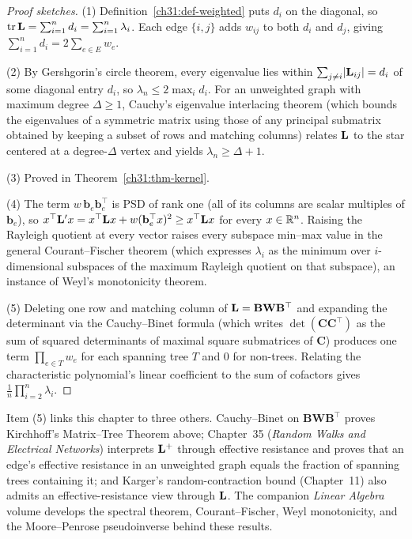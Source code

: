 \begin{proof}[Proof sketches]
(1) Definition~\ref{ch31:def-weighted} puts $d_i$ on the diagonal, so $\operatorname{tr}\mathbf{L} = \sum_{i=1}^n d_i = \sum_{i=1}^n \lambda_i$. Each edge $\{i,j\}$ adds $w_{ij}$ to both $d_i$ and $d_j$, giving $\sum_{i=1}^n d_i = 2\sum_{e\in E} w_e$.

(2) By Gershgorin's circle theorem, every eigenvalue lies within $\sum_{j\neq i}\lvert\mathbf{L}_{ij}\rvert = d_i$ of some diagonal entry $d_i$, so $\lambda_n \le 2\max_i d_i$. For an unweighted graph with maximum degree $\Delta \ge 1$, Cauchy's eigenvalue interlacing theorem (which bounds the eigenvalues of a symmetric matrix using those of any principal submatrix obtained by keeping a subset of rows and matching columns) relates $\mathbf{L}$ to the star centered at a degree-$\Delta$ vertex and yields $\lambda_n \ge \Delta + 1$.

(3) Proved in Theorem~\ref{ch31:thm-kernel}.

(4) The term $w\,\mathbf{b}_e\mathbf{b}_e^\top$ is PSD of rank one (all of its columns are scalar multiples of $\mathbf{b}_e$), so $x^\top \mathbf{L}' x = x^\top \mathbf{L} x + w(\mathbf{b}_e^\top x)^2 \ge x^\top \mathbf{L} x$ for every $x\in\mathbb{R}^n$. Raising the Rayleigh quotient at every vector raises every subspace min--max value in the general Courant--Fischer theorem (which expresses $\lambda_i$ as the minimum over $i$-dimensional subspaces of the maximum Rayleigh quotient on that subspace), an instance of Weyl's monotonicity theorem.

(5) Deleting one row and matching column of $\mathbf{L} = \mathbf{B}\mathbf{W}\mathbf{B}^\top$ and expanding the determinant via the Cauchy--Binet formula (which writes $\det(\mathbf{C}\mathbf{C}^\top)$ as the sum of squared determinants of maximal square submatrices of $\mathbf{C}$) produces one term $\prod_{e\in T} w_e$ for each spanning tree $T$ and $0$ for non-trees. Relating the characteristic polynomial's linear coefficient to the sum of cofactors gives $\tfrac1n\prod_{i=2}^n \lambda_i$.
\end{proof}

\begin{connectionbox}
Item (5) links this chapter to three others. Cauchy--Binet on $\mathbf{B}\mathbf{W}\mathbf{B}^\top$ proves Kirchhoff's Matrix--Tree Theorem above; Chapter~35 (\emph{Random Walks and Electrical Networks}) interprets $\mathbf{L}^{+}$ through effective resistance and proves that an edge's effective resistance in an unweighted graph equals the fraction of spanning trees containing it; and Karger's random-contraction bound (Chapter~11) also admits an effective-resistance view through $\mathbf{L}$. The companion \emph{Linear Algebra} volume develops the spectral theorem, Courant--Fischer, Weyl monotonicity, and the Moore--Penrose pseudoinverse behind these results.
\end{connectionbox}

